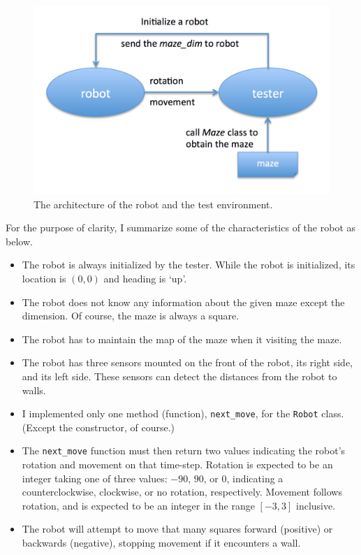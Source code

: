 \documentclass[11pt, oneside]{article}   	%
\begin{document}
\begin{figure}[htbp] %
   \centering
   \includegraphics[width=14cm]{api.png} 
   \caption{The architecture of the robot and the test environment.}
   \label{fig:api} 
\end{figure}

For the purpose of clarity, I summarize some of the characteristics of the robot as below.
\begin{itemize}
\item The robot is always initialized by the tester. While the robot is initialized, its location is $(0,0)$ and heading is `up'.
\item The robot does not know any information about the given maze except the dimension. Of course, the maze is always a square.
\item The robot has to maintain the map of the maze when it visiting the maze.
\item The robot has three sensors mounted on the front of the robot, its right side, and its left side. These sensors can detect the distances from the robot to walls.
\item I implemented only one method (function), \texttt{next\_move}, for the \texttt{Robot} class. (Except the constructor, of course.)
\item The \texttt{next\_move} function must then return two values indicating the robot's rotation and movement on that time-step. Rotation is expected to be an integer taking one of three values: $-90$, $90$, or $0$, indicating a counterclockwise, clockwise, or no rotation, respectively. Movement follows rotation, and is expected to be an integer in the range $[-3, 3]$ inclusive.
\item The robot will attempt to move that many squares forward (positive) or backwards (negative), stopping movement if it encounters a wall.
\end{itemize}
\end{document}
